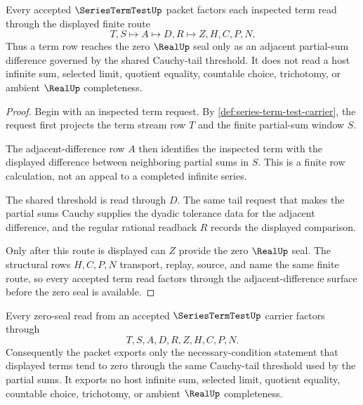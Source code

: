 \begin{theorem}
\label{thm:series-term-test-adjacent-difference-route}
Every accepted $\SeriesTermTestUp$ packet factors each inspected term read through the displayed finite route
$$
T,S \longmapsto A \longmapsto D,R \longmapsto Z,H,C,P,N .
$$
Thus a term row reaches the zero $\RealUp$ seal only as an adjacent partial-sum difference governed by the shared Cauchy-tail threshold. It does not read a host infinite sum, selected limit, quotient equality, countable choice, trichotomy, or ambient $\RealUp$ completeness.
\end{theorem}

\begin{proof}
Begin with an inspected term request. By \autoref{def:series-term-test-carrier}, the request first projects the term stream row $T$ and the finite partial-sum window $S$.

The adjacent-difference row $A$ then identifies the inspected term with the displayed difference between neighboring partial sums in $S$. This is a finite row calculation, not an appeal to a completed infinite series.

The shared threshold is read through $D$. The same tail request that makes the partial sums Cauchy supplies the dyadic tolerance data for the adjacent difference, and the regular rational readback $R$ records the displayed comparison.

Only after this route is displayed can $Z$ provide the zero $\RealUp$ seal. The structural rows $H,C,P,N$ transport, replay, source, and name the same finite route, so every accepted term read factors through the adjacent-difference surface before the zero seal is available.
\end{proof}

\begin{theorem}
\label{thm:series-term-test-zero-seal-nonescape}
Every zero-seal read from an accepted $\SeriesTermTestUp$ carrier factors through
$$
T,S,A,D,R,Z,H,C,P,N .
$$
Consequently the packet exports only the necessary-condition statement that displayed terms tend to zero through the same Cauchy-tail threshold used by the partial sums. It exports no host infinite sum, selected limit, quotient equality, countable choice, trichotomy, or ambient $\RealUp$ completeness.
\end{theorem}

